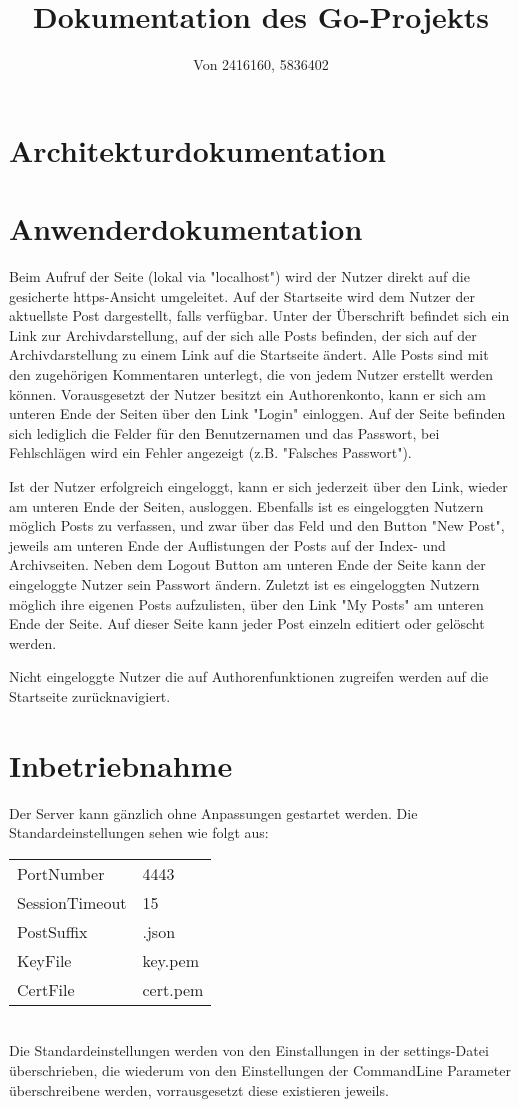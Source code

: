 \documentclass[10pt]{article}
\title{Dokumentation des Go-Projekts}
\author{Von 2416160, 5836402}
\date{}
\begin{document}
\maketitle
	\section{Architekturdokumentation}
	\section{Anwenderdokumentation}
	Beim Aufruf der Seite (lokal via "localhost") wird der Nutzer direkt auf die gesicherte https-Ansicht umgeleitet.
	Auf der Startseite wird dem Nutzer der aktuellste Post dargestellt, falls verf\"ugbar.
	Unter der \"Uberschrift befindet sich ein Link zur Archivdarstellung, auf der sich alle Posts befinden, der sich auf der Archivdarstellung zu einem Link auf die Startseite \"andert.
	Alle Posts sind mit den zugeh\"origen Kommentaren unterlegt, die von jedem Nutzer erstellt werden k\"onnen.
	Vorausgesetzt der Nutzer besitzt ein Authorenkonto, kann er sich am unteren Ende der Seiten \"uber den Link "Login" einloggen.
	Auf der Seite befinden sich lediglich die Felder f\"ur den Benutzernamen und das Passwort, bei Fehlschl\"agen wird ein Fehler angezeigt (z.B. "Falsches Passwort").
	
	Ist der Nutzer erfolgreich eingeloggt, kann er sich jederzeit \"uber den Link, wieder am unteren Ende der Seiten, ausloggen.
	Ebenfalls ist es eingeloggten Nutzern m\"oglich Posts zu verfassen, und zwar \"uber das Feld und den Button "New Post", jeweils am unteren Ende der Auflistungen der Posts auf der Index- und Archivseiten.
	Neben dem Logout Button am unteren Ende der Seite kann der eingeloggte Nutzer sein Passwort \"andern.
	Zuletzt ist es eingeloggten Nutzern m\"oglich ihre eigenen Posts aufzulisten, \"uber den Link "My Posts" am unteren Ende der Seite.
	Auf dieser Seite kann jeder Post einzeln editiert oder gel\"oscht werden.
	
	Nicht eingeloggte Nutzer die auf Authorenfunktionen zugreifen werden auf die Startseite zur\"ucknavigiert.
	\section{Inbetriebnahme}
		Der Server kann g\"anzlich ohne Anpassungen gestartet werden.
		Die Standardeinstellungen sehen wie folgt aus:
		\begin{tabular}{l|l}
			PortNumber &     4443\\
			SessionTimeout & 15\\
			PostSuffix & .json\\
			KeyFile & key.pem\\
			CertFile & cert.pem\\
		\end{tabular}\\
		Die Standardeinstellungen werden von den Einstallungen in der settings-Datei \"uberschrieben, die wiederum von den Einstellungen der CommandLine Parameter \"uberschreibene werden, vorrausgesetzt diese existieren jeweils.
		
\end{document}
